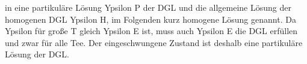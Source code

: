 \begin{frame}
{in eine partikuläre Lösung Ypsilon P der DGL und die allgemeine Lösung der homogenen DGL Ypsilon H, 
im Folgenden kurz homogene Lösung genannt.
Da Ypsilon für große T gleich Ypsilon E ist, muss auch Ypsilon E die DGL erfüllen und zwar für alle Tee.
Der eingeschwungene Zustand ist deshalb eine partikuläre Lösung der DGL. 
}%
\end{frame}


